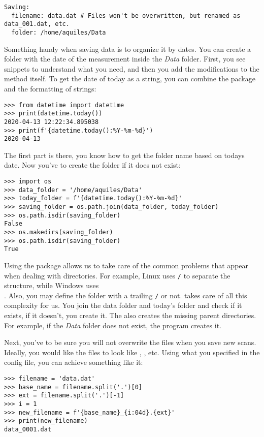 \begin{verbatim}
Saving:
  filename: data.dat # Files won't be overwritten, but renamed as data_001.dat, etc.
  folder: /home/aquiles/Data
\end{verbatim}

Something handy when saving data is to organize it by dates. You can create a folder with the date of the measurement inside the \emph{Data} folder. First, you see snippets to understand what you need, and then you add the modifications to the method itself. To get the date of today as a string, you can combine the  package and the formatting of strings:

\begin{verbatim}
>>> from datetime import datetime
>>> print(datetime.today())
2020-04-13 12:22:34.895038
>>> print(f'{datetime.today():%Y-%m-%d}')
2020-04-13
\end{verbatim}

The first part is there, you know how to get the folder name based on todays date. Now you've to create the folder if it does not exist:

\begin{verbatim}
>>> import os
>>> data_folder = '/home/aquiles/Data'
>>> today_folder = f'{datetime.today():%Y-%m-%d}'
>>> saving_folder = os.path.join(data_folder, today_folder)
>>> os.path.isdir(saving_folder)
False
>>> os.makedirs(saving_folder)
>>> os.path.isdir(saving_folder)
True
\end{verbatim}

Using the package  allows us to take care of the common problems that appear when dealing with directories. For example, Linux uses \texttt{/} to separate the structure, while Windows uses \texttt{\\}. Also, you may define the folder with a trailing \texttt{/} or not.  takes care of all this complexity for us. You join the data folder and today's folder and check if it exists, if it doesn't, you create it. The  also creates the missing parent directories. For example, if the \emph{Data} folder does not exist, the program creates it.

Next, you've to be sure you will not overwrite the files when you save new scans. Ideally, you would like the files to look like , , etc. Using what you specified in the config file, you can achieve something like it:

\begin{verbatim}
>>> filename = 'data.dat'
>>> base_name = filename.split('.')[0]
>>> ext = filename.split('.')[-1]
>>> i = 1
>>> new_filename = f'{base_name}_{i:04d}.{ext}'
>>> print(new_filename)
data_0001.dat
\end{verbatim}

